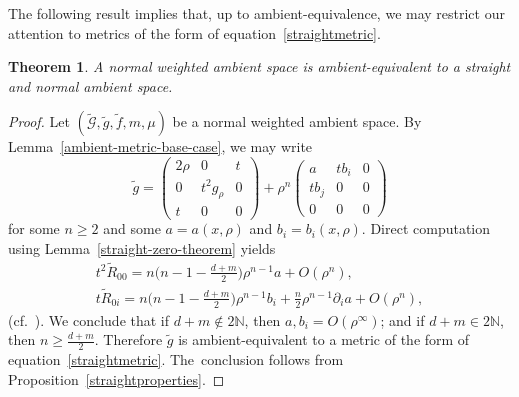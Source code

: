 \documentclass[pdftex]{sigma}
\numberwithin{equation}{section}
\newtheorem{Theorem}{Theorem}[section]
\begin{document}
The following result implies that, up to ambient-equivalence, we may restrict our attention to metrics of the form of equation~\eqref{straightmetric}.
\begin{Theorem}
\label{normal-to-straight-and-normal}
A normal weighted ambient space is ambient-equivalent to a straight and normal ambient space.
\end{Theorem}
\begin{proof}
Let $(\widetilde{\mathcal{G}},\widetilde{g},\widetilde{f},m,\mu)$ be a normal weighted ambient space. By Lemma~\ref{ambient-metric-base-case}, we may write
\[
\widetilde{g}=\begin{pmatrix} 2\rho&0&t\\0&t^2 g_\rho& 0\\ t&0&0\end{pmatrix}+\rho^n \begin{pmatrix} a& tb_i& 0\\ tb_j & 0 & 0\\ 0&0&0\end{pmatrix}
\]
for some $n\geq 2$ and some $a=a(x,\rho)$ and $b_i=b_i(x,\rho)$. Direct computation using Lemma~\ref{straight-zero-theorem} yields
\begin{gather*}
t^{2} \widetilde{R}_{00}=n\bigg(n-1-\frac{d+m}{2}\bigg) \rho^{n-1} a+O(\rho^{n}),
\\
t \widetilde{R}_{0 i}=n\bigg(n-1-\frac{d+m}{2}\bigg) \rho^{n-1} b_i+\frac{n}{2} \rho^{n-1} \partial_{i} a+O(\rho^{n}),
\end{gather*}
(cf.\ \cite[equation~(3.11)]{FeffermanGraham2012}).
We conclude that if $d+m\notin 2\mathbb{N}$, then $a,b_i=O(\rho^\infty)$; and if $d+m\in 2\mathbb{N}$, then $n\geq \frac{d+m}{2}$. Therefore $\widetilde{g}$ is ambient-equivalent to a metric of the form of equation~\eqref{straightmetric}. The~conclusion follows from Proposition~\ref{straightproperties}.
\end{proof}
\end{document}
